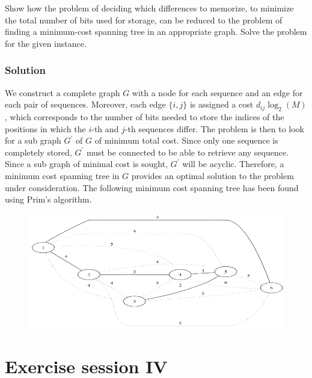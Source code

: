 \documentclass[12pt, a4paper]{report}
\newtheorem[style=M,bodystyle=\normalfont]{theorem}{Theorem}
\newtheorem[style=M,bodystyle=\normalfont]{corollary}{Corollary}
\newtheorem[style=M,bodystyle=\normalfont]{lemma}{Lemma}
\newtheorem[style=M,bodystyle=\normalfont]{definition}{Definition}
\begin{document}
        Show how the problem of deciding which differences to memorize, to minimize the total number of bits used for storage, can be reduced to the problem of finding a 
        minimum-cost spanning tree in an appropriate graph. Solve the problem for the given instance. 
    \subsection*{Solution}
        We construct a complete graph $G$ with a node for each sequence and an edge for each pair of sequences. Moreover, each edge $\{i,j\}$ is assigned a cost 
        $d_{ij}\log_2(M)$, which corresponds to the number of bits needed to store the indices of the positions in which the $i$-th and $j$-th sequences differ.
        The problem is then to look for a sub graph $G^{'}$ of $G$ of minimum total cost. Since only one sequence is completely stored, $G^{'}$ must be connected to be 
        able to retrieve any sequence. Since a sub graph of minimal cost is sought, $G^{'}$ will be acyclic. Therefore, a minimum cost spanning tree in $G$ provides an 
        optimal solution to the problem under consideration. The following minimum cost spanning tree has been found using Prim's algorithm. 
        \begin{figure}[H]
            \centering
            \includegraphics[width=1\linewidth]{images/DNA1.png}
        \end{figure}

\newpage

\chapter{Exercise session IV}
\end{document}
